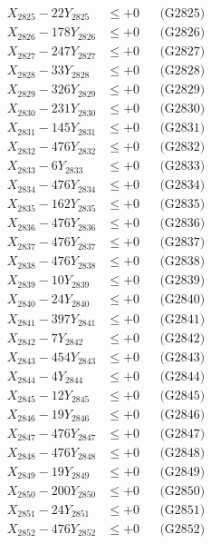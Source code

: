 \documentclass[a4paper,10pt]{article}
\begin{document}
{\begin{align}
X_{2825} - 22Y_{2825} &\leq +0 && \text{(G2825)} \\
X_{2826} - 178Y_{2826} &\leq +0 && \text{(G2826)} \\
X_{2827} - 247Y_{2827} &\leq +0 && \text{(G2827)} \\
X_{2828} - 33Y_{2828} &\leq +0 && \text{(G2828)} \\
X_{2829} - 326Y_{2829} &\leq +0 && \text{(G2829)} \\
X_{2830} - 231Y_{2830} &\leq +0 && \text{(G2830)} \\
\allowbreak
X_{2831} - 145Y_{2831} &\leq +0 && \text{(G2831)} \\
X_{2832} - 476Y_{2832} &\leq +0 && \text{(G2832)} \\
X_{2833} - 6Y_{2833} &\leq +0 && \text{(G2833)} \\
X_{2834} - 476Y_{2834} &\leq +0 && \text{(G2834)} \\
X_{2835} - 162Y_{2835} &\leq +0 && \text{(G2835)} \\
X_{2836} - 476Y_{2836} &\leq +0 && \text{(G2836)} \\
X_{2837} - 476Y_{2837} &\leq +0 && \text{(G2837)} \\
X_{2838} - 476Y_{2838} &\leq +0 && \text{(G2838)} \\
X_{2839} - 10Y_{2839} &\leq +0 && \text{(G2839)} \\
X_{2840} - 24Y_{2840} &\leq +0 && \text{(G2840)} \\
\allowbreak
X_{2841} - 397Y_{2841} &\leq +0 && \text{(G2841)} \\
X_{2842} - 7Y_{2842} &\leq +0 && \text{(G2842)} \\
X_{2843} - 454Y_{2843} &\leq +0 && \text{(G2843)} \\
X_{2844} - 4Y_{2844} &\leq +0 && \text{(G2844)} \\
X_{2845} - 12Y_{2845} &\leq +0 && \text{(G2845)} \\
X_{2846} - 19Y_{2846} &\leq +0 && \text{(G2846)} \\
X_{2847} - 476Y_{2847} &\leq +0 && \text{(G2847)} \\
X_{2848} - 476Y_{2848} &\leq +0 && \text{(G2848)} \\
X_{2849} - 19Y_{2849} &\leq +0 && \text{(G2849)} \\
X_{2850} - 200Y_{2850} &\leq +0 && \text{(G2850)} \\
\allowbreak
X_{2851} - 24Y_{2851} &\leq +0 && \text{(G2851)} \\
X_{2852} - 476Y_{2852} &\leq +0 && \text{(G2852)} \\

\end{align}}
\end{document}
